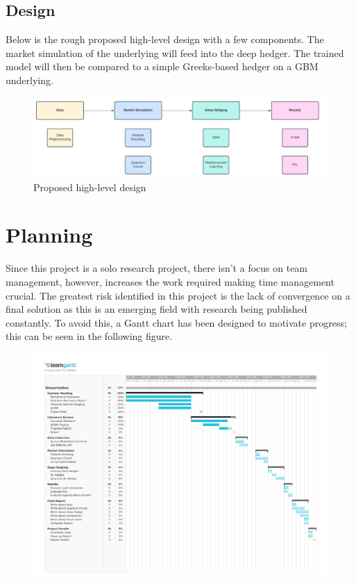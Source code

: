 \documentclass[12pt]{article}
\numberwithin{equation}{section}
\begin{document}
\subsection{Design}
Below is the rough proposed high-level design with a few components. The market 
simulation of the underlying will feed into the deep hedger. The trained model 
will then be compared to a simple Greeks-based hedger on a GBM underlying.
\begin{figure}[h!]
    \centering
    \includegraphics[width=\textwidth]{pipeline.png}
    \caption{Proposed high-level design}
\end{figure}

\clearpage 
\section{Planning}
Since this project is a solo research project, there isn't a focus on team 
management, however, increases the work required making 
time management crucial. The greatest risk identified in this project is the 
lack of convergence on a final solution as this is an emerging field with research 
being published constantly. To avoid this, a Gantt chart has been designed to 
motivate progress; this can be seen in the following figure.
\begin{figure}[htp]
\includegraphics[page=1,width=\textwidth,scale=1.4]{GanttChart.pdf}
\end{figure}
\end{document}
